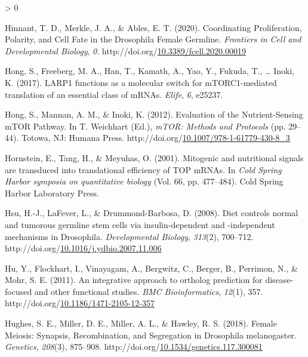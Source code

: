 \documentclass[12pt,oneside]{reedthesis}
\newlength{\cslhangindent}
\newenvironment{CSLReferences}[2] %
 {%
  \setlength{\parindent}{0pt}
  \ifodd #1 \everypar{\setlength{\hangindent}{\cslhangindent}}\ignorespaces\fi
  \ifnum #2 > 0
  \setlength{\parskip}{#2\baselineskip}
  \fi
 }%
 {}
\begin{document}
\begin{CSLReferences}{1}{0}
\leavevmode\hypertarget{ref-hinnantCoordinatingProliferationPolarity2020}{}%
Hinnant, T. D., Merkle, J. A., \& Ables, E. T. (2020). Coordinating {Proliferation}, {Polarity}, and {Cell Fate} in the {Drosophila Female Germline}. \emph{Frontiers in Cell and Developmental Biology}, \emph{0}. http://doi.org/\href{https://doi.org/10.3389/fcell.2020.00019}{10.3389/fcell.2020.00019}

\leavevmode\hypertarget{ref-Hong2017a}{}%
Hong, S., Freeberg, M. A., Han, T., Kamath, A., Yao, Y., Fukuda, T., \ldots{} Inoki, K. (2017). {LARP1} functions as a molecular switch for {mTORC1-mediated} translation of an essential class of {mRNAs}. \emph{Elife}, \emph{6}, e25237.

\leavevmode\hypertarget{ref-hongEvaluationNutrientSensingMTOR2012}{}%
Hong, S., Mannan, A. M., \& Inoki, K. (2012). Evaluation of the {Nutrient-Sensing mTOR Pathway}. In T. Weichhart (Ed.), \emph{{mTOR}: {Methods} and {Protocols}} (pp. 29--44). {Totowa, NJ}: {Humana Press}. http://doi.org/\href{https://doi.org/10.1007/978-1-61779-430-8_3}{10.1007/978-1-61779-430-8\_3}

\leavevmode\hypertarget{ref-Hornstein2001a}{}%
Hornstein, E., Tang, H., \& Meyuhas, O. (2001). Mitogenic and nutritional signals are transduced into translational efficiency of {TOP mRNAs}. In \emph{Cold {Spring Harbor} symposia on quantitative biology} (Vol. 66, pp. 477--484). {Cold Spring Harbor Laboratory Press}.

\leavevmode\hypertarget{ref-hsuDietControlsNormal2008}{}%
Hsu, H.-J., LaFever, L., \& Drummond-Barbosa, D. (2008). Diet controls normal and tumorous germline stem cells via insulin-dependent and -independent mechanisms in {Drosophila}. \emph{Developmental Biology}, \emph{313}(2), 700--712. http://doi.org/\href{https://doi.org/10.1016/j.ydbio.2007.11.006}{10.1016/j.ydbio.2007.11.006}

\leavevmode\hypertarget{ref-huIntegrativeApproachOrtholog2011}{}%
Hu, Y., Flockhart, I., Vinayagam, A., Bergwitz, C., Berger, B., Perrimon, N., \& Mohr, S. E. (2011). An integrative approach to ortholog prediction for disease-focused and other functional studies. \emph{BMC Bioinformatics}, \emph{12}(1), 357. http://doi.org/\href{https://doi.org/10.1186/1471-2105-12-357}{10.1186/1471-2105-12-357}

\leavevmode\hypertarget{ref-hughesFemaleMeiosisSynapsis2018}{}%
Hughes, S. E., Miller, D. E., Miller, A. L., \& Hawley, R. S. (2018). Female {Meiosis}: {Synapsis}, {Recombination}, and {Segregation} in {Drosophila} melanogaster. \emph{Genetics}, \emph{208}(3), 875--908. http://doi.org/\href{https://doi.org/10.1534/genetics.117.300081}{10.1534/genetics.117.300081}


\end{CSLReferences}
\end{document}
